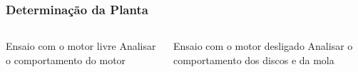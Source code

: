 \documentclass{beamer}
\begin{document}
\begin{frame}
\frametitle{Determinação da Planta}
\begin{columns}
	\begin{column}{0.5\textwidth}
	\begin{block}{Ensaio com o motor livre}
		Analisar o comportamento do motor
		\begin{center}
		\end{center}
	\end{block}
	\end{column}
	
	\begin{column}{0.5\textwidth}
	\begin{block}{Ensaio com o motor desligado}
		Analisar o comportamento dos discos e da mola
		

\end{block}
\end{column}
\end{columns}
\end{frame}
\end{document}
